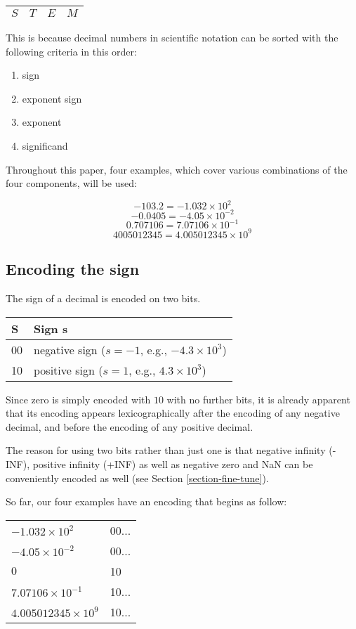 \documentclass[final,leqno,onefignum,onetabnum]{siamltex1213}
\begin{document}
\begin{tabular}{|l|l|l|l|}
\hline
$S$ & $T$ & $E$ & $M$ \\
\hline
\end{tabular}

This is because decimal numbers in scientific notation can be sorted with the following criteria in this order:
\begin{enumerate}
\item sign
\item exponent sign
\item exponent
\item significand
\end{enumerate}



Throughout this paper, four examples, which cover various combinations of the four components, will be used:

$$-103.2 = - 1.032 \times 10^2$$
$$-0.0405 = -4.05 \times 10^{-2}$$
$$0.707106 = 7.07106 \times 10^{-1}$$
$$4005012345 = 4.005012345 \times 10^9$$


\subsection{Encoding the sign}

The sign of a decimal is encoded on two bits.

\begin{tabular}{|l|l|}
\hline
S & Sign s \\
\hline
00 &  negative sign ($s=-1$, e.g., $-4.3\times10^3$)\\
\hline
10 & positive sign ($s=1$, e.g., $4.3\times10^3$)\\
\hline
\end{tabular}


Since zero is simply encoded with $10$ with no further bits, it is already apparent that its encoding appears lexicographically after the encoding of any negative decimal, and before the encoding of any positive decimal.

The reason for using two bits rather than just one is that negative infinity (-INF), positive infinity (+INF) as well as negative zero and NaN can be conveniently encoded as well (see Section \ref{section-fine-tune}).

So far, our four examples have an encoding that begins as follow:

\begin{tabular}{l|l}
$- 1.032 \times 10^2$ & 00... \\

$-4.05 \times 10^{-2}$ & 00... \\

$0$ & 10 \\

$7.07106 \times 10^{-1}$ & 10... \\

$4.005012345 \times 10^9$ & 10...\\
\end{tabular}
\end{document}
